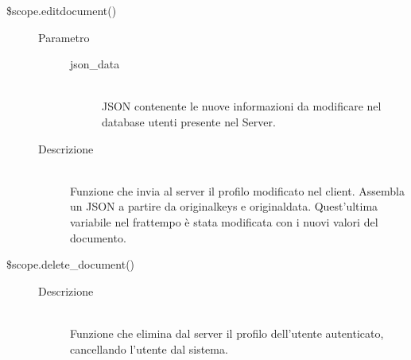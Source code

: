 \begin{description}
\begin{description}
  \item[\$scope.edit\textunderscore document()] \hfill 
  \begin{description}
  	\item[Parametro] \hfill
  		\begin{description}
  			\item[json\_data] \hfill \\
  			JSON contenente le nuove informazioni da modificare nel database utenti presente nel Server.
       \end{description}
  	\item[Descrizione] \hfill \\
Funzione che invia al server il profilo modificato nel client.
  Assembla un JSON a partire da original\textunderscore keys e original\textunderscore data. Quest'ultima variabile nel frattempo è stata modificata con i nuovi valori del documento.
    \end{description}
  
  
\item[\$scope.delete\_document()] \hfill
	 \begin{description}
	 	\item[Descrizione] \hfill \\	 
  Funzione che elimina dal server il profilo dell'utente autenticato, cancellando l'utente dal sistema.
  	 \end{description}
 \end{description}
\end{description}

